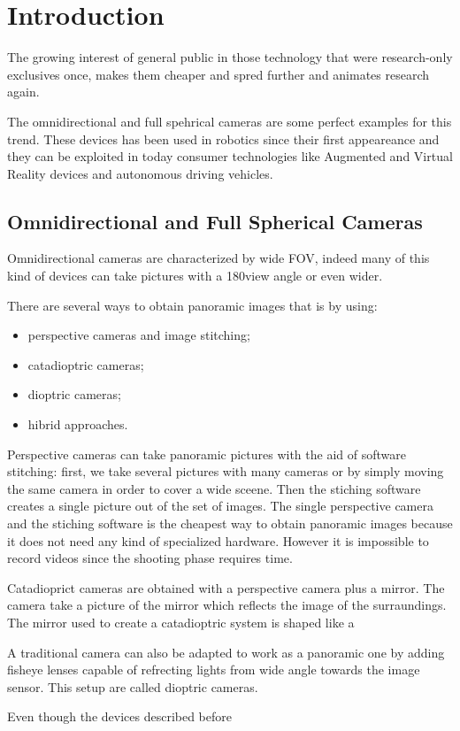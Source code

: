\chapter{Introduction}
The growing interest of general public in those technology that were 
research-only exclusives once, makes them cheaper and spred further and
animates research again.

The omnidirectional and full spehrical cameras are some perfect examples for 
this trend.
These devices has been used in robotics since their first appeareance and they 
can be exploited in today consumer technologies like Augmented and Virtual 
Reality devices and autonomous driving vehicles.

\section{Omnidirectional and Full Spherical Cameras}
\label{sec:cameraclassification}
Omnidirectional cameras are characterized by wide FOV, indeed many of this kind
of devices can take pictures with a 180\degree view angle or even wider.

There are several ways to obtain panoramic images that is by using:
\begin{itemize}
	\item perspective cameras and image stitching;
	\item catadioptric cameras;
	\item dioptric cameras;
	\item hibrid approaches.
\end{itemize}

Perspective cameras can take panoramic pictures with the aid of 
software stitching: first, we take several pictures with many cameras or by
simply moving 
the same camera in order to cover a wide sceene. Then the stiching software 
creates a single picture out of the set of images.
The single perspective camera and the stiching software is the cheapest 
way to obtain panoramic images because it does not need any kind of specialized 
hardware. However it is impossible to record videos since the shooting phase 
requires time.

Catadioprict cameras are obtained with a perspective camera plus a mirror. 
The camera take a picture of the mirror which reflects the image of the 
surraundings. The mirror used to create a catadioptric system is shaped like a 


A traditional camera can also be adapted to work as a panoramic one by adding
fisheye lenses capable of refrecting lights from wide angle towards the 
image sensor. This setup are called dioptric cameras.

Even though the devices described before 
